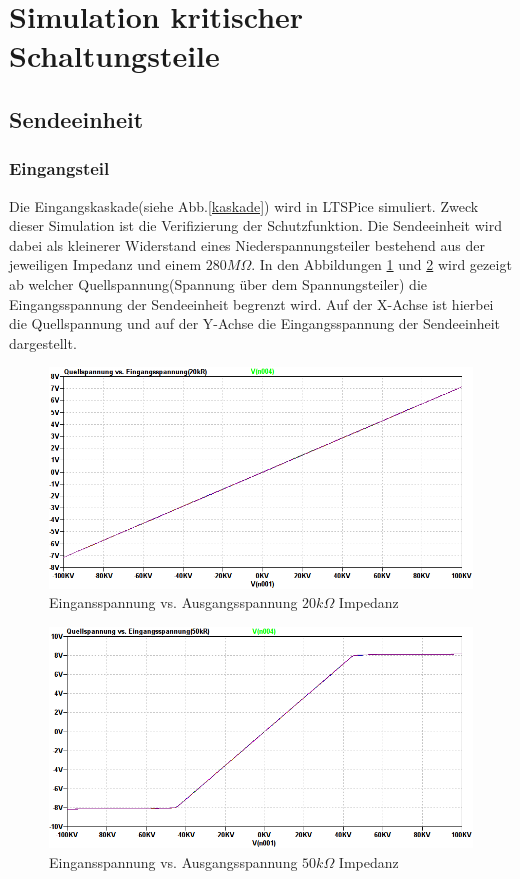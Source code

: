 \section{Simulation kritischer Schaltungsteile}
\subsection{Sendeeinheit}
\subsubsection{Eingangsteil}
Die Eingangskaskade(siehe Abb.\ref{kaskade}) wird in LTSPice simuliert. Zweck dieser Simulation ist die Verifizierung der Schutzfunktion. Die Sendeeinheit wird dabei als kleinerer Widerstand eines Niederspannungsteiler bestehend aus der jeweiligen Impedanz und einem $280M\Omega$. In den Abbildungen \ref{impedanz20k} und \ref{impedanz50k} wird gezeigt ab welcher Quellspannung(Spannung über dem Spannungsteiler) die Eingangsspannung der Sendeeinheit begrenzt wird. Auf der X-Achse ist hierbei die Quellspannung und auf der Y-Achse die Eingangsspannung der Sendeeinheit dargestellt. 
\begin{figure}[H]
\centering
 \includegraphics[scale=0.5]{gfx/simTx/Impedance20k.png}
 \caption{Eingansspannung vs. Ausgangsspannung $20k\Omega$ Impedanz}
	\label{impedanz20k} 
\end{figure}


\begin{figure}[H]
\centering
\includegraphics[scale=0.5]{gfx/simTx/Impedance50k.png}
 \caption{Eingansspannung vs. Ausgangsspannung $50k\Omega$ Impedanz}
	\label{impedanz50k} 
\end{figure}


